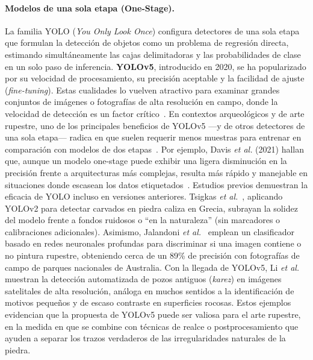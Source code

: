 \paragraph{Modelos de una sola etapa (One-Stage).}
La familia YOLO (\textit{You Only Look Once}) configura detectores de una sola etapa que formulan la detección de objetos como un problema de regresión directa, estimando simultáneamente las cajas delimitadoras y las probabilidades de clase en un solo paso de inferencia. \textbf{YOLOv5}, introducido en 2020, se ha popularizado por su velocidad de procesamiento, su precisión aceptable y la facilidad de ajuste (\textit{fine-tuning}). Estas cualidades lo vuelven atractivo para examinar grandes conjuntos de imágenes o fotografías de alta resolución en campo, donde la velocidad de detección es un factor crítico~\cite{li2022}. En contextos arqueológicos y de arte rupestre, uno de los principales beneficios de YOLOv5 —y de otros detectores de una sola etapa— radica en que suelen requerir menos muestras para entrenar en comparación con modelos de dos etapas~\cite{suhaimi2023}. Por ejemplo, Davis \textit{et al.} (2021) hallan que, aunque un modelo one-stage puede exhibir una ligera disminución en la precisión frente a arquitecturas más complejas, resulta más rápido y manejable en situaciones donde escasean los datos etiquetados~\cite{davis2021}. Estudios previos demuestran la eficacia de YOLO incluso en versiones anteriores. Tsigkas \textit{et al.}~\cite{tsigkas2020}, aplicando YOLOv2 para detectar carvados en piedra caliza en Grecia, subrayan la solidez del modelo frente a fondos ruidosos o “en la naturaleza” (sin marcadores o calibraciones adicionales). Asimismo, Jalandoni \textit{et al.}~\cite{jalandoni2022} emplean un clasificador basado en redes neuronales profundas para discriminar si una imagen contiene o no pintura rupestre, obteniendo cerca de un 89\% de precisión con fotografías de campo de parques nacionales de Australia. Con la llegada de YOLOv5, Li \textit{et al.}~\cite{li2022} muestran la detección automatizada de pozos antiguos (\textit{karez}) en imágenes satelitales de alta resolución, análoga en muchos sentidos a la identificación de motivos pequeños y de escaso contraste en superficies rocosas. Estos ejemplos evidencian que la propuesta de YOLOv5 puede ser valiosa para el arte rupestre, en la medida en que se combine con técnicas de realce o postprocesamiento que ayuden a separar los trazos verdaderos de las irregularidades naturales de la piedra.

